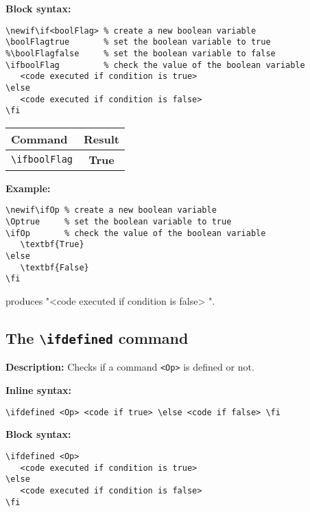 \documentclass[12pt]{article}
\newif\ifboolFlag \boolFlagtrue %
\begin{document}
	\noindent\textbf{Block syntax:}
	\begin{lstlisting}
\newif\if<boolFlag> % create a new boolean variable
\boolFlagtrue       % set the boolean variable to true
%\boolFlagfalse     % set the boolean variable to false
\ifboolFlag         % check the value of the boolean variable
   <code executed if condition is true>
\else
   <code executed if condition is false>
\fi
	\end{lstlisting}

	\begin{center}
		\begin{tabular}{l|c}
			\hline
			\textbf{Command} & \textbf{Result} \\
			\hline
			\verb|\ifboolFlag| & \ifboolFlag \textbf{True} \else \textbf{False} \fi \\ 
			\hline
		\end{tabular}
	\end{center}

	\noindent\textbf{Example:} 
	\begin{lstlisting}
\newif\ifOp % create a new boolean variable
\Optrue     % set the boolean variable to true
\ifOp       % check the value of the boolean variable
   \textbf{True}
\else
   \textbf{False}
\fi
	\end{lstlisting}
	\noindent produces "\newif\ifOp \Optrue \Opfalse \ifOp <code executed if condition is true> \else <code executed if condition is false> \fi".
	\subsection{The \texttt{\textbackslash ifdefined} command}
	\noindent\textbf{Description:} Checks if a command \textcolor{green!50!black}{\texttt{<Op>}} is defined or not.

	\noindent\textbf{Inline syntax:}
	\begin{lstlisting}
\ifdefined <Op> <code if true> \else <code if false> \fi
	\end{lstlisting}

	\noindent\textbf{Block syntax:}
	\begin{lstlisting}
\ifdefined <Op>
   <code executed if condition is true>
\else
   <code executed if condition is false>
\fi
	\end{lstlisting}
\end{document}

